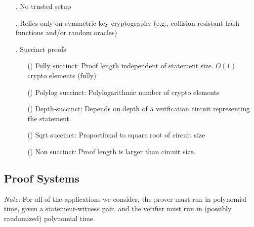 \begin{enumerate}
    \item[\newfeat.\label{feat:plain}] No trusted setup
    \item[\newfeat.\label{feat:symm-key}] Relies only on symmetric-key cryptography (e.g., collision-resistant hash functions and/or random oracles)
    \item[\newfeat.\label{feat:succint}] Succinct proofs
				\begin{enumerate}
        \item[(\newsubfeat)\label{subfeat:succinct:fully}] Fully succinct: Proof length independent of statement size. $O(1)$ crypto elements (fully)
        \item[(\newsubfeat)\label{subfeat:succinct:polylog}] Polylog succinct: Polylogarithmic number of crypto elements
        \item[(\newsubfeat)\label{subfeat:succinct:depth}] Depth-succinct: Depends on depth of a verification circuit representing the statement.
        \item[(\newsubfeat)\label{subfeat:succinct:sqrt}] Sqrt succinct: Proportional to square root of circuit size
        \item[(\newsubfeat)\label{subfeat:succinct:non}] Non succinct: Proof length is larger than circuit size.
				\end{enumerate}
\end{enumerate}


\subsection{Proof Systems}
\label{paradigms:taxonomy:proof-systems} 

\emph{Note:} For all of the applications we consider, the prover must run in polynomial time, given a statement-witness pair, and the verifier must run in (possibly randomized) polynomial time.\loosen

